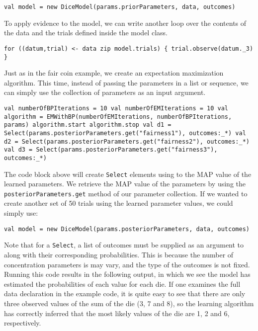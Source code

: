 \begin{flushleft}
 \texttt{val model = new DiceModel(params.priorParameters, data, outcomes)
}
\end{flushleft}

To apply evidence to the model, we can write another loop over the contents of the data and the trials defined inside the model class.

\begin{flushleft}
\texttt{for ((datum,trial) <- data zip model.trials) \{
    \newline \tab trial.observe(datum.\_3)
    \}
}
\end{flushleft}

Just as in the fair coin example, we create an expectation maximization algorithm. This time, instead of passing the parameters in a list or sequence, we can simply use the collection of parameters as an input argument.

\begin{flushleft}
\texttt{val numberOfBPIterations = 10
	\newline val numberOfEMIterations = 10
    \newline val algorithm = EMWithBP(numberOfEMIterations, numberOfBPIterations, params)
    \newline algorithm.start
    \newline algorithm.stop
    \newline val d1 = Select(params.posteriorParameters.get("fairness1"), outcomes:\_*)
    \newline val d2 = Select(params.posteriorParameters.get("fairness2"), outcomes:\_*)
    \newline val d3 = Select(params.posteriorParameters.get("fairness3"), outcomes:\_*)
}
\end{flushleft}

The code block above will create \texttt{Select} elements using to the MAP value of the learned parameters. We retrieve the MAP value of the parameters by using the \texttt{posteriorParameters.get} method of our parameter collection. If we wanted to create another set of 50 trials using the learned parameter values, we could simply use:

\begin{flushleft}
 \texttt{val model = new DiceModel(params.posteriorParameters, data, outcomes)
}
\end{flushleft}

Note that for a \texttt{Select}, a list of outcomes must be supplied as an argument to along with their corresponding probabilities. This is because the number of concentration parameters is may vary, and the type of the outcomes is not fixed. Running this code results in the following output, in which we see the model has estimated the probabilities of each value for each die. If one examines the full data declaration in the example code, it is quite easy to see that there are only three observed values of the sum of the die (3, 7 and 8), so the learning algorithm has correctly inferred that the most likely values of the die are 1, 2 and 6, respectively.

